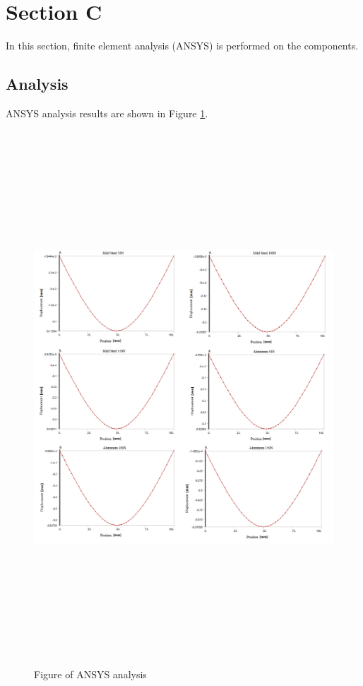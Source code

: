 \section*{Section C}
\label{sec:Section C}
\FloatBarrier %

In this section, finite element analysis (ANSYS) is performed on the components.

\subsection*{Analysis}

ANSYS analysis results are shown in Figure \ref{f2}.

\begin{figure}[htbp]
    \centering
    \includegraphics[width=18cm,height=20cm]{./fig/mix2.jpg}
    \caption{Figure of ANSYS analysis}
    \label{f2}
\end{figure}


